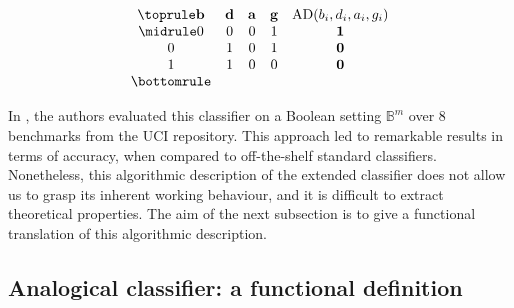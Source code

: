 \begin{table}[t]
  \centering
  $$
  \begin{array}{ccccc}
    \toprule
    \mathbf{b} & \mathbf{d} & \mathbf{a} & \mathbf{g} &  \AD(b_i, d_i, a_i, g_i)\\
    \midrule
    0 & 0 & 0 & 1 &   \textbf{1}\\
    0 & 1 & 0 & 1 &   \textbf{0}\\
    1 & 1 & 0 & 0 &   \textbf{0}\\
    \bottomrule
  \end{array}
  $$
  \caption{$\AD(\mathbf{b}, \mathbf{d}, \mathbf{a}, \mathbf{g}) = 1$.}
  \label{TAB:AD_bdag}
\end{table}



In \cite{BayMicDelIJCAI07}, the authors evaluated this classifier on a Boolean
setting $\mathbb{B}^m$ over 8 benchmarks from the UCI repository.  This
approach led to remarkable results in terms of accuracy, when compared to
off-the-shelf standard classifiers. Nonetheless, this algorithmic description
of the extended classifier does not allow us to grasp its inherent working
behaviour, and it is difficult to extract theoretical properties. The aim of
the next subsection is to give a functional translation of this algorithmic
description.

\subsection{Analogical classifier: a functional definition}
\label{SEC:functional_definition}

